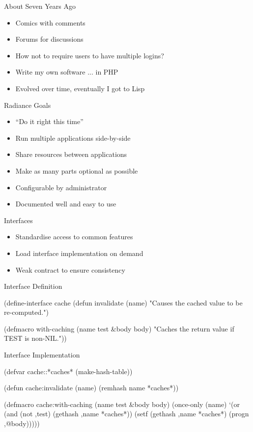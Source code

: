 \documentclass[14pt]{beamer}
\newcommand{\toptitle}[1]{
  {\huge #1} \\
  \vspace{0.2cm}
}
\begin{document}
\begin{frame}
  \toptitle{About Seven Years Ago}
  \begin{itemize}
  \item Comics with comments
  \item Forums for discussions
  \item How not to require users to have multiple logins?
    \pause
  \item Write my own software \pause ... in PHP
  \item Evolved over time, eventually I got to Lisp
  \end{itemize}
\end{frame}

\begin{frame}
  \toptitle{Radiance Goals}
  \begin{itemize}
  \item ``Do it right this time''
  \item Run multiple applications side-by-side
  \item Share resources between applications
  \item Make as many parts optional as possible
  \item Configurable by administrator
  \item Documented well and easy to use
  \end{itemize}
\end{frame}

\begin{frame}
  \toptitle{Interfaces}
  \begin{itemize}
  \item Standardise access to common features
  \item Load interface implementation on demand
  \item Weak contract to ensure consistency
  \end{itemize}
\end{frame}

\begin{frame}[fragile]
  \toptitle{Interface Definition}
\begin{lispcode}
(define-interface cache
  (defun invalidate (name)
    "Causes the cached value to be re-computed.")

  (defmacro with-caching (name test &body body)
    "Caches the return value if TEST is non-NIL."))
\end{lispcode}
\end{frame}

\begin{frame}[fragile]
  \toptitle{Interface Implementation}
\begin{lispcode}
(defvar cache::*caches* (make-hash-table))

(defun cache:invalidate (name)
  (remhash name *caches*))

(defmacro cache:with-caching (name test &body body)
  (once-only (name)
    `(or (and (not ,test) (gethash ,name *caches*))
         (setf (gethash ,name *caches*)
               (progn ,@body)))))
\end{lispcode}
\end{frame}
\end{document}
